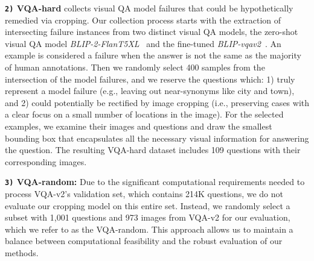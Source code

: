 \textbf{\texttt{2)} VQA-hard} collects visual QA model failures that could be hypothetically remedied via cropping. Our collection process starts with the extraction of intersecting failure instances from two distinct visual QA models, the zero-shot visual QA model \textit{BLIP-2-FlanT5XL}~\citep{li2023blip} and the fine-tuned \textit{BLIP-vqav2}~\citep{blip}. 
An example is considered a failure when the answer is not the same as the majority of human annotations.
Then we randomly select 400 samples from the intersection of the model failures, and we reserve the questions which: 1) truly represent a model failure (e.g., leaving out near-synonyms like city and town), and 2) could potentially be rectified by image cropping (i.e., preserving cases with a clear focus on a small number of locations in the image). For the selected examples, we examine their images and questions and draw the smallest bounding box that encapsulates all the necessary visual information for answering the question.
The resulting VQA-hard dataset includes 109 questions with their corresponding images.






\textbf{\texttt{3)} VQA-random:} Due to the significant computational requirements needed to process VQA-v2's validation set, which contains 214K questions, we do not evaluate our cropping model on this entire set. Instead, we randomly select a subset with 1,001 questions and 973 images from VQA-v2 for our evaluation, which we refer to as the VQA-random. This approach allows us to maintain a balance between computational feasibility and the robust evaluation of our methods. 

